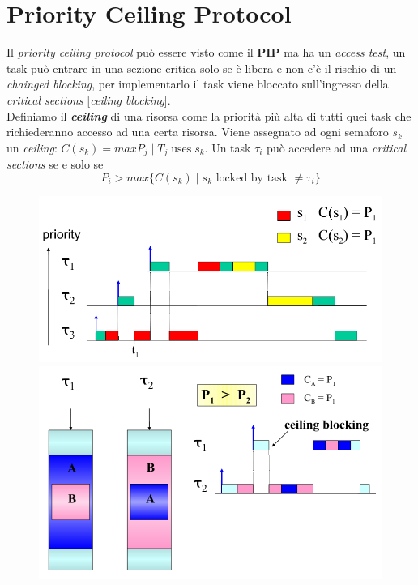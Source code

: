 \section{Priority Ceiling Protocol}
Il \textit{priority ceiling protocol} può essere visto come il \textbf{PIP} ma ha un \textit{access test}, un task può entrare in una sezione critica solo se è libera e non c'è il rischio di un \textit{chainged blocking}, per implementarlo il task viene bloccato sull'ingresso della \textit{critical sections} [\textit{ceiling blocking}]. \\
Definiamo il \textbf{\textit{ceiling}} di una risorsa come la priorità più alta di tutti quei task che richiederanno accesso ad una certa risorsa. Viene assegnato ad ogni semaforo $s_k$ un \textit{ceiling}: $C(s_k) = max{P_j \; | \; T_j \; \text{uses} \; s_k}$. Un task $\tau_i$ può accedere ad una \textit{critical sections} se e solo se \[P_i > max\{C(s_k) \; | \; s_k \text{ locked by task } \neq \tau_i\}\]
\begin{figure}[h]
    \centering
    \begin{minipage}[t]{0.45\textwidth}
        \centering
        \includegraphics[width=\textwidth]{img/pcp_1}
    \end{minipage}
    \begin{minipage}[t]{0.45\textwidth}
        \centering
        \includegraphics[width=\textwidth]{img/pcp_2}
    \end{minipage}
\end{figure}
